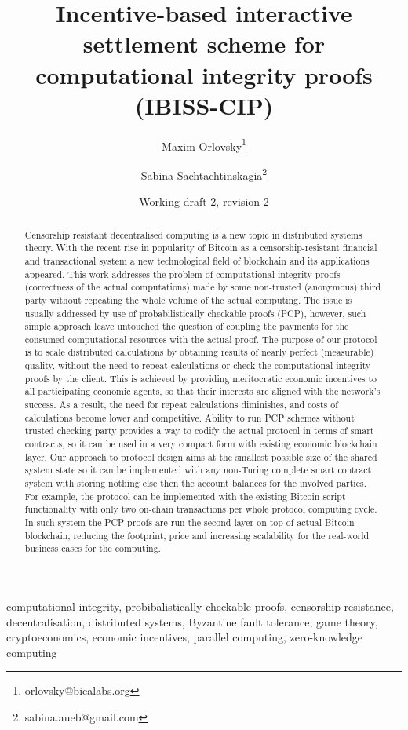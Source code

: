\documentclass[conference]{IEEEtran}
\title{Incentive-based interactive settlement scheme for computational integrity proofs (IBISS-CIP)}
\author[1,2]{Maxim Orlovsky\thanks{orlovsky@bicalabs.org}}
\author[1,3]{Sabina Sachtachtinskagia\thanks{sabina.aueb@gmail.com}}
\affil[1]{Pandora Core AG, Switzerland}
\affil[2]{BICA Labs, Switzerland}
\affil[3]{Athens University of Economics and Business, Greece}
\date{Working draft 2, revision 2}
\begin{document}
\maketitle

\begin{abstract}
Censorship resistant decentralised computing is a new topic in distributed systems theory. With the recent rise in popularity of Bitcoin as a censorship-resistant financial and transactional system a new technological field of blockchain and its applications appeared. This work addresses the problem of computational integrity proofs (correctness of the actual computations) made by some non-trusted (anonymous) third party without repeating the whole volume of the actual computing. The issue is usually addressed by use of probabilistically checkable proofs (PCP), however, such simple approach leave untouched the question of coupling the payments for the consumed computational resources with the actual proof. The purpose of our protocol is to scale distributed calculations by obtaining results of nearly perfect (measurable) quality, without the need to repeat calculations or check the computational integrity proofs by the client. This is achieved by providing meritocratic economic incentives to all participating economic agents, so that their interests are aligned with the network's success. As a result, the need for repeat calculations diminishes, and costs of calculations become lower and competitive. Ability to run PCP schemes without trusted checking party provides a way to codify the actual protocol in terms of smart contracts, so it can be used in a very compact form with existing economic blockchain layer. Our approach to protocol design aims at the smallest possible size of the shared system state so it can be implemented with any non-Turing complete smart contract system with storing nothing else then the account balances for the involved parties. For example, the protocol can be implemented with the existing Bitcoin script functionality with only two on-chain transactions per whole protocol computing cycle. In such system the PCP proofs are run the second layer on top of actual Bitcoin blockchain, reducing the footprint, price and increasing scalability for the real-world business cases for the computing.
\end{abstract}

\begin{IEEEkeywords}
computational integrity, probibalistically checkable proofs, censorship resistance, decentralisation, distributed systems, Byzantine fault tolerance, game theory, cryptoeconomics, economic incentives, parallel computing, zero-knowledge computing
\end{IEEEkeywords}
\end{document}
